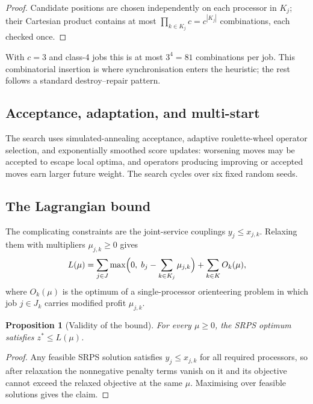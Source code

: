 \documentclass[11pt,a4paper]{article}
\newcommand{\Kj}{\ensuremath{K_j}}
\newtheorem{proposition}{Proposition}
\begin{document}
\begin{proof}
Candidate positions are chosen independently on each processor in $\Kj$; their
Cartesian product contains at most $\prod_{k\in \Kj} c = c^{|\Kj|}$ combinations,
each checked once.
\end{proof}

With $c=3$ and class-4 jobs this is at most $3^4=81$ combinations per job. This
combinatorial insertion is where synchronisation enters the heuristic; the rest
follows a standard destroy--repair pattern.

\subsection{Acceptance, adaptation, and multi-start}

The search uses simulated-annealing acceptance, adaptive roulette-wheel operator
selection, and exponentially smoothed score updates: worsening moves may be
accepted to escape local optima, and operators producing improving or accepted
moves earn larger future weight. The search cycles over six fixed random seeds.

\subsection{The Lagrangian bound}\label{sec:lagbound}

The complicating constraints are the joint-service couplings $y_j \le x_{j,k}$.
Relaxing them with multipliers $\mu_{j,k}\ge 0$ gives
\begin{equation}\label{eq:lag}
L(\mu) = \sum_{j\in J} \max\Bigl(0,\; b_j - \sum_{k\in \Kj}\mu_{j,k}\Bigr)
       + \sum_{k\in K} O_k(\mu),
\end{equation}
where $O_k(\mu)$ is the optimum of a single-processor orienteering problem in
which job $j\in J_k$ carries modified profit $\mu_{j,k}$.

\begin{proposition}[Validity of the bound]
For every $\mu\ge 0$, the SRPS optimum satisfies $z^\ast \le L(\mu)$.
\end{proposition}

\begin{proof}
Any feasible SRPS solution satisfies $y_j\le x_{j,k}$ for all required processors,
so after relaxation the nonnegative penalty terms vanish on it and its objective
cannot exceed the relaxed objective at the same $\mu$. Maximising over feasible
solutions gives the claim.
\end{proof}
\end{document}
